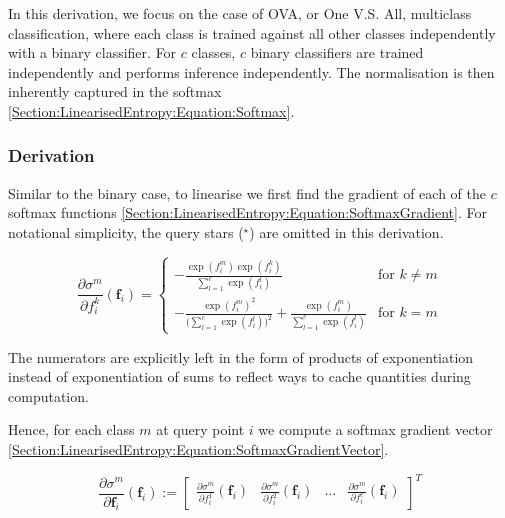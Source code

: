 \documentclass{article}
\renewcommand{\vec}[1]{\boldsymbol{#1}}
\begin{document}
		In this derivation, we focus on the case of OVA, or One V.S. All, multiclass classification, where each class is trained against all other classes independently with a binary classifier. For $c$ classes, $c$ binary classifiers are trained independently and performs inference independently. The normalisation is then inherently captured in the softmax \eqref{Section:LinearisedEntropy:Equation:Softmax}.
		
		\subsubsection{Derivation}
		
			Similar to the binary case, to linearise we first find the gradient of each of the $c$ softmax functions \eqref{Section:LinearisedEntropy:Equation:SoftmaxGradient}. For notational simplicity, the query stars ($^{\star}$) are omitted in this derivation.
			
			\begin{equation}
				\frac{\partial \sigma^{m}}{\partial f^{k}_{i}}(\vec{f}_{i}) =
				\begin{cases} 
					- \frac{\exp(f^{m}_{i}) \exp(f^{k}_{i})}{\sum_{l = 1}^{c} \exp(f^{l}_{i})} & \text{for } k \neq m  \\
					- \frac{\exp(f^{m}_{i})^{2}}{\big(\sum_{l = 1}^{c} \exp(f^{l}_{i})\big)^{2}} + \frac{\exp(f^{m}_{i})}{\sum_{l = 1}^{c} \exp(f^{l}_{i})}& \text{for } k = m
				\end{cases}
			\label{Section:LinearisedEntropy:Equation:SoftmaxGradient}
			\end{equation}			
		
			The numerators are explicitly left in the form of products of exponentiation instead of exponentiation of sums to reflect ways to cache quantities during computation. 
			
			Hence, for each class $m$ at query point $i$ we compute a softmax gradient vector \eqref{Section:LinearisedEntropy:Equation:SoftmaxGradientVector}.
			
			\begin{equation}
				\frac{\partial \sigma^{m}}{\partial \vec{f}_{i}}(\vec{f}_{i}) := \begin{bmatrix} \frac{\partial \sigma^{m}}{\partial f^{1}_{i}}(\vec{f}_{i}) & \frac{\partial \sigma^{m}}{\partial f^{2}_{i}}(\vec{f}_{i}) & \dots & \frac{\partial \sigma^{m}}{\partial f^{c}_{i}}(\vec{f}_{i}) \end{bmatrix}^{T}
			\label{Section:LinearisedEntropy:Equation:SoftmaxGradientVector}
			\end{equation}
			
\end{document}
